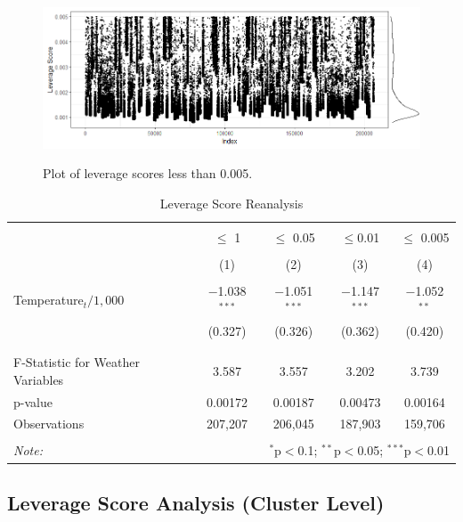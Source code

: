 \documentclass{article}
\begin{document}
	\begin{figure}[h!]
		\centering
		\caption{Plot of leverage scores less than 0.005.}
		\includegraphics[width=\textwidth]{leverage_scores_4.jpg}
		\label{fig:leverage_scores2}
	\end{figure}
	
	\begin{table}[!h] \centering 
		\caption{Leverage Score Reanalysis} 
		\label{tab:leverage_reanalysis} 
		\begin{tabular}{@{\extracolsep{5pt}}lcccc} 
			\\[-1.8ex]\hline 
			\hline \\[-1.8ex] 
			& $\leq$ 1 & $\leq$ 0.05 & $\leq$0.01 & $\leq$ 0.005 \\ 
			\\[-1.8ex] & (1) & (2) & (3) & (4)\\ 
			\hline \\[-1.8ex] 
			Temperature$_t/1,000$ & $-$1.038$^{***}$ & $-$1.051$^{***}$ & $-$1.147$^{***}$ & $-$1.052$^{**}$ \\ 
			& (0.327) & (0.326) & (0.362) & (0.420) \\ 
			& & & & \\ 
			\hline \\[-1.8ex] 
			F-Statistic for Weather Variables & 3.587 & 3.557 & 3.202 & 3.739 \\ 
			p-value & 0.00172 & 0.00187 & 0.00473 & 0.00164 \\ 
			Observations & 207,207 & 206,045 & 187,903 & 159,706 \\ 
			\hline 
			\hline \\[-1.8ex] 
			\textit{Note:}  & \multicolumn{4}{r}{$^{*}$p$<$0.1; $^{**}$p$<$0.05; $^{***}$p$<$0.01} \\ 
		\end{tabular} 
	\end{table} 
	
	\subsection{Leverage Score Analysis (Cluster Level)}
	
\end{document}
